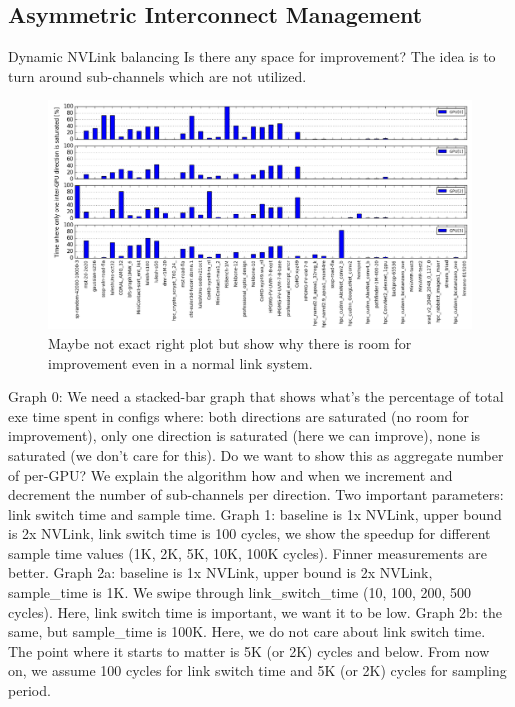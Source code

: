 \subsection{Asymmetric Interconnect Management}

Dynamic NVLink balancing Is there any space for improvement? The idea is to turn around sub-channels which are not utilized. 

\begin{figure}[tp]
    \centering
    \includegraphics[width=0.9\columnwidth]{figures/link-motivation.jpg}
    \caption{Maybe not exact right plot but show why there is room for improvement even in a normal link system.}
    \label{fig:link-motivation}
\end{figure}

Graph 0: We need a stacked-bar graph that shows what’s the percentage of total exe time spent in configs where: both directions are saturated (no room for improvement), only one direction is saturated (here we can improve), none is saturated (we don’t care for this). Do we want to show this as aggregate number of per-GPU?
We explain the algorithm how and when we increment and decrement the number of sub-channels per direction. Two important parameters: link switch time and sample time.
Graph 1: baseline is 1x NVLink, upper bound is 2x NVLink, link switch time is 100 cycles, we show the speedup for different sample time values (1K, 2K, 5K, 10K, 100K cycles). Finner measurements are better.
Graph 2a: baseline is 1x NVLink, upper bound is 2x NVLink, sample\_time is 1K. We swipe through link\_switch\_time (10, 100, 200, 500 cycles). Here, link switch time is important, we want it to be low.
Graph 2b: the same, but sample\_time is 100K. Here, we do not care about link switch time. The point where it starts to matter is 5K (or 2K) cycles and below. From now on, we assume 100 cycles for link switch time and 5K (or 2K) cycles for sampling period.


